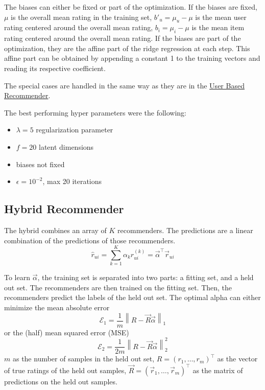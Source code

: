\documentclass[sigconf]{acmart}
\newcommand{\norm}[1]{\left\| #1 \right\|}
\def\T{\top}
\begin{document}
The biases can either be fixed or part of the optimization.
If the biases are fixed, $\mu$ is the overall mean rating in the training set, $b'_u = \mu_u - \mu$ is the mean user rating centered around the overall mean rating, $b_i = \mu_i - \mu$ is the mean item rating centered around the overall mean rating.
If the biases are part of the optimization, they are the affine part of the ridge regression at each step.
This affine part can be obtained by appending a constant 1 to the training vectors and reading its respective coefficient.

The special cases are handled in the same way as they are in the \hyperlink{special_cases}{User Based Recommender}.

The best performing hyper parameters were the following:
\begin{itemize}
	\item $\lambda = 5$ regularization parameter
	\item $f = 20$ latent dimensions
	\item biases not fixed
	\item $\epsilon = 10^{-2}$, max 20 iterations
\end{itemize}


\subsection[Hybrid]{Hybrid Recommender}
\label{sec:methods:hybrid}
The hybrid combines an array of $K$ recommenders. The predictions are a linear combination of the predictions of those recommenders.
$$\hat{r}_{ui} = \sum\limits_{k = 1}^{K} \alpha_k \hat{r}^{(k)}_{ui} = \vec{\alpha}^\T \vec{r}_{ui}$$

To learn $\vec{\alpha}$, the training set is separated into two parts: a fitting set, and a held out set.
The recommenders are then trained on the fitting set.
Then, the recommenders predict the labels of the held out set.
The optimal alpha can either minimize the mean absolute error
$$\mathcal{E}_1 = \frac{1}{m}\norm{R - \vec{R} \vec{\alpha}}_1$$
or the (half) mean squared error (MSE)
$$\mathcal{E}_2 = \frac{1}{2m}\norm{R - \vec{R} \vec{\alpha}}^2_2$$
$m$ as the number of samples in the held out set,
$R = (r_1, \dots, r_m)^\T$ as the vector of true ratings of the held out samples,
$\vec{R} = (\vec{r}_1, \dots, \vec{r}_m)^\T$ as the matrix of predictions on the held out samples.
\end{document}
